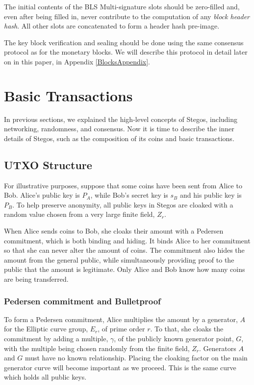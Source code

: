 \documentclass[8pt,fleqn,openany]{book}
\begin{document}
The initial contents of the BLS Multi-signature slots should be zero-filled and, even after being filled in, never contribute to the computation of any \textit{block header hash}. All other slots are concatenated to form a header hash pre-image.

The key block verification and sealing should be done using the same consensus protocol as for the monetary blocks. We will describe this protocol in detail later on in this paper, in Appendix \ref{BlocksAppendix}.

\section{Basic Transactions}

In previous sections, we explained the high-level concepts of Stegos, including networking, randomness, and consensus. Now it is time to describe the inner details of Stegos, such as the composition of its coins and basic transactions.

\subsection{UTXO Structure}

For illustrative purposes, suppose that some coins have been sent from Alice to Bob. Alice’s public key is $P_A$, while Bob’s secret key is $s_B$ and his public key is $P_B$. To help preserve anonymity, all public keys in Stegos are cloaked with a random value chosen from a very large finite field, $Z_r$.

When Alice sends coins to Bob, she cloaks their amount with a Pedersen commitment, which is both binding and hiding. It binds Alice to her commitment so that she can never alter the amount of coins. The commitment also hides the amount from the general public, while simultaneously providing proof to the public that the amount is legitimate. Only Alice and Bob know how many coins are being transferred. 

\subsubsection{Pedersen commitment and Bulletproof} To form a Pedersen commitment, Alice multiplies the amount by a generator, $A$ for the Elliptic curve group, $E_r$, of prime order $r$. To that, she cloaks the commitment by adding a multiple, $\gamma$, of the publicly known generator point, $G$, with the multiple being chosen randomly from the finite field, $Z_r$. Generators $A$ and $G$ must have no known relationship. Placing the cloaking factor on the main generator curve will become important as we proceed. This is the same curve which holds all public keys. 
\end{document}

